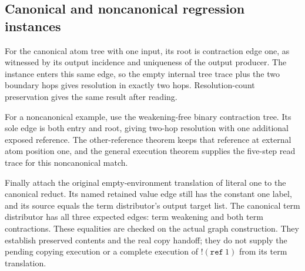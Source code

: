 



\subsection{Canonical and noncanonical regression instances}

For the canonical atom tree with one input, its root is contraction edge
one, as witnessed by its output incidence and uniqueness of the output
producer. The instance enters this same edge, so the empty internal tree
trace plus the two boundary hops gives resolution in exactly two hops.
Resolution-count preservation gives the same result after reading.

For a noncanonical example, use the weakening-free binary contraction tree.
Its sole edge is both entry and root, giving two-hop resolution with one
additional exposed reference. The other-reference theorem keeps that reference
at external atom position one, and the general execution theorem supplies the
five-step read trace for this noncanonical match.






Finally attach the original empty-environment translation of literal one
to the canonical reduct. Its named retained value edge still has the constant
one label, and its source equals the term distributor's output target list.
The canonical term distributor has all three expected edges: term weakening
and both term contractions. These equalities are checked on the actual graph
construction. They establish preserved contents and the real copy handoff;
they do not supply the pending copying execution or a complete execution of
$!(\mathtt{ref}\ 1)$ from its term translation.

